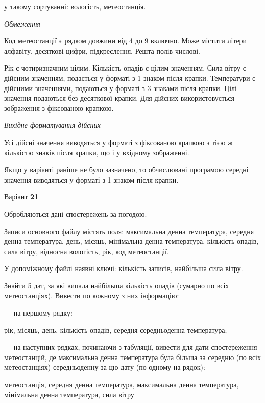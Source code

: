 \documentclass[11pt, ukrainian]{article}
\begin{document}
{\noindent}у такому сортуванні: вологість, метеостанція.


\bigskip\textit{Обмеження}

Код метеостанції є рядком довжини від 4 до 9 включно.
Може містити літери алфавіту, десяткові цифри, підкреслення. Решта полів числові.

Рік є чотиризначним цілим.
Кількість опадів є цілим значенням.
Сила вітру є дійсним значенням, подається у форматі з 1 знаком після крапки.
Температури є дійсними значеннями, подаються у форматі з 3 знаками після крапки.
Цілі значення подаються без десяткової крапки.
Для дійсних використовується зображення з фіксованою крапкою.

\textit{Вихідне форматування дійсних}

Усі дійсні значення виводяться у форматі з фіксованою крапкою з тією ж кількістю знаків після крапки, що і у вхідному зображенні.

Якщо у варіанті раніше не було зазначено, то \underline{обчислювані програмою} середні значення виводяться у форматі з 1 знаком після крапки.


\par
\newpage
{\center Варіант  \No \textbf { 21 }\par}
\bigskip
Обробляються дані спостережень за погодою. 

\underline{Записи основного файлу містять поля}: максимальна денна температура, середня денна температура, день, місяць, мінімальна денна температура, кількість опадів, сила вітру, відносна вологість, рік, код метеостанції.

\underline{У допоміжному файлі наявні ключі}: кількість записів, найбільша сила вітру.

\underline{Знайти} 5 дат, за які випала найбільша кількість опадів (сумарно по всіх метеостанціях). Вивести по кожному з них інформацію:\par
{\noindent}--- на першому рядку:\par
рік, місяць, день, кількість опадів, середня середньоденна температура;

{\noindent}--- на наступних рядках, починаючи з табуляції, вивести для дати спостереження метеостанцій, де максимальна денна температура була більша за середню (по всіх метеостанціях) середньоденну за цю дату (по одному на рядок):\par
метеостанція, середня денна температура, максимальна денна температура, мінімальна денна температура, сила вітру
\end{document}
